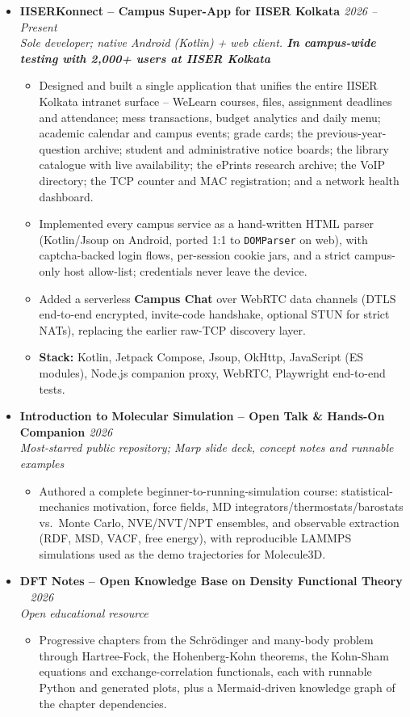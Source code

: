 \documentclass[a4paper,10pt]{article}
\newcommand{\resumeProject}[4]{
    \item\small{
        \textbf{#1} \hfill \textit{#2}\\
        \textit{#3}\\
        \begin{itemize}[leftmargin=1.5em,label=\textbullet,nosep,itemsep=0.5pt]
            #4
        \end{itemize}
    }\vspace{2pt}
}
\begin{document}
{\begin{itemize}[leftmargin=*,label={},itemsep=4pt]
    \resumeProject{IISERKonnect -- Campus Super-App for IISER Kolkata \href{https://shuvam-banerji-seal.github.io/iiserkonnect-website/}{\faGlobe}}{2026 -- Present}
    {Sole developer; native Android (Kotlin) + web client. \textbf{In campus-wide testing with 2,000+ users at IISER Kolkata}}
    {\item Designed and built a single application that unifies the entire IISER Kolkata intranet surface -- WeLearn courses, files, assignment deadlines and attendance; mess transactions, budget analytics and daily menu; academic calendar and campus events; grade cards; the previous-year-question archive; student and administrative notice boards; the library catalogue with live availability; the ePrints research archive; the VoIP directory; the TCP counter and MAC registration; and a network health dashboard.
    \item Implemented every campus service as a hand-written HTML parser (Kotlin/Jsoup on Android, ported 1:1 to \texttt{DOMParser} on web), with captcha-backed login flows, per-session cookie jars, and a strict campus-only host allow-list; credentials never leave the device.
    \item Added a serverless \textbf{Campus Chat} over WebRTC data channels (DTLS end-to-end encrypted, invite-code handshake, optional STUN for strict NATs), replacing the earlier raw-TCP discovery layer.
    \item \textbf{Stack:} Kotlin, Jetpack Compose, Jsoup, OkHttp, JavaScript (ES modules), Node.js companion proxy, WebRTC, Playwright end-to-end tests.}

    \resumeProject{Introduction to Molecular Simulation -- Open Talk \& Hands-On Companion \href{https://github.com/Shuvam-Banerji-Seal/introduction-to-molecular-simulation}{\faGithub}}{2026}
    {Most-starred public repository; Marp slide deck, concept notes and runnable examples}
    {\item Authored a complete beginner-to-running-simulation course: statistical-mechanics motivation, force fields, MD integrators/thermostats/barostats vs.\ Monte Carlo, NVE/NVT/NPT ensembles, and observable extraction (RDF, MSD, VACF, free energy), with reproducible LAMMPS simulations used as the demo trajectories for Molecule3D.}

    \resumeProject{DFT Notes -- Open Knowledge Base on Density Functional Theory \href{https://github.com/Shuvam-Banerji-Seal/DFT-notes}{\faGithub}\ \href{https://shuvam-banerji-seal.github.io/DFT-notes/}{\faGlobe}}{2026}
    {Open educational resource}
    {\item Progressive chapters from the Schr\"odinger and many-body problem through Hartree-Fock, the Hohenberg-Kohn theorems, the Kohn-Sham equations and exchange-correlation functionals, each with runnable Python and generated plots, plus a Mermaid-driven knowledge graph of the chapter dependencies.}


\end{itemize}}
\end{document}
